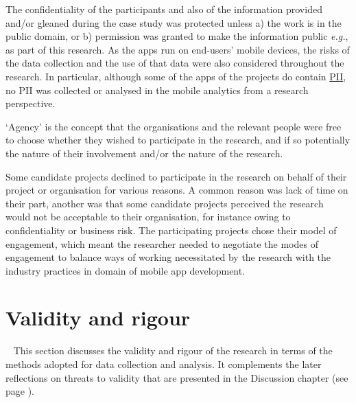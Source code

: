 The confidentiality of the participants and also of the information provided and/or gleaned during the case study was protected unless a) the work is in the public domain, or b) permission was granted to make the information public \textit{e.g.}, as part of this research.
As the apps run on end-users' mobile devices, the risks of the data collection and the use of that data were also considered throughout the research. In particular, although some of the apps of the projects do contain \href{glossary-pii}{PII}, no PII was collected or analysed in the mobile analytics from a research perspective.

`Agency' is the concept that the organisations and the relevant people were free to choose whether they wished to participate in the research, and if so potentially the nature of their involvement and/or the nature of the research. 

Some candidate projects declined to participate in the research on behalf of their project or organisation for various reasons. A common reason was lack of time on their part, another was that some candidate projects perceived the research would not be acceptable to their organisation, for instance owing to confidentiality or business risk. The participating projects chose their model of engagement, which meant the researcher needed to negotiate the modes of engagement to balance ways of working necessitated by the research with the industry practices in domain of mobile app development.


\section{Validity and rigour}~\label{methodology-threats-to-validity-section}
This section discusses the validity and rigour of the research in terms of the methods adopted for data collection and analysis. It complements the later reflections on threats to validity that are presented in the Discussion chapter (see page \pageref{discussion-threats-to-validity-section}).

